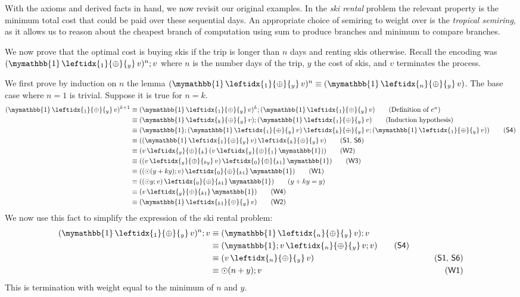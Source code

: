 \documentclass[a4paper,UKenglish,cleveref, autoref, thm-restate]{lipics-v2021}
\newcommand{\WC}[2]{\,\leftidx{_{#1}}{{\oplus}}{_{#2}}\,}
\newcommand{\bskip}{\mymathbb{1}}
\theoremstyle{plain}\newtheoremrep{thm}{Theorem}[section]
\begin{document}
	With the axioms and derived facts in hand, we now revisit our original examples. In the \emph{ski rental} problem the relevant property is the minimum total cost that could be paid over these sequential days. An appropriate choice of semiring to weight over is the \emph{tropical semiring}, as it allows us to reason about the cheapest branch of computation using sum to produce branches and minimum to compare branches. 
	\begin{exmp}
		We now prove that the optimal cost is  buying skis if the trip is longer than $n$ days and renting skis otherwise. Recall the encoding was $(\bskip \WC{1}{y} v)^n;v$ where $n$ is the number days of the trip, $y$ the cost of skis, and $v$ terminates the process. 
		
		We first prove by induction on $n$ the lemma $(\bskip \WC{1}{y} v)^n \equiv (\bskip \WC{n}{y} v)$. The base case where $n=1$ is trivial. Suppose it is true for $n=k$.
		\begin{align*}
			(\bskip \WC{1}{y} v)^{k+1} &\equiv (\bskip \WC{1}{y} v)^{k};(\bskip \WC{1}{y} v) \tag{Definition of $e^n$}\\
			&\equiv (\bskip \WC{k}{y} v);(\bskip \WC{1}{y} v) \tag{Induction hypothesis}\\
			&\equiv (\bskip;(\bskip \WC{1}{y} v) \WC{k}{y} v;(\bskip \WC{1}{y} v)) \tag{\textsf{S4}}\\
			&\equiv ((\bskip \WC{1}{y} v) \WC{k}{y} v) \tag{\textsf{S1, S6}}\\
			&\equiv (v \WC{y}{k} (v \WC{y}{1} \bskip)) \tag{\textsf{W2}}\\
			&\equiv ((v \WC{y}{ky} v) \WC{0}{k1} \bskip) \tag{\textsf{W3}}\\
			&\equiv (( \odot(y+ky);v) \WC{0}{k1} \bskip) \tag{\textsf{W1}}\\
			&\equiv (( \odot y;v) \WC{0}{k1} \bskip) \tag{$y+ky=y$}\\
			&\equiv (v \WC{y}{k1} \bskip) \tag{\textsf{W4}}\\
			&\equiv (\bskip \WC{k1}{y} v) \tag{\textsf{W2}}
		\end{align*}
		We now use this fact to simplify the expression of the ski rental problem:
		\begin{align*}
			(\bskip \WC{1}{y} v)^n;v &\equiv (\bskip \WC{n}{y} v);v \\
			&\equiv (\bskip;v\WC{n}{y} v;v) \tag{\textsf{S4}}\\
			&\equiv (v\WC{n}{y} v) & \tag{\textsf{S1, S6}}\\
			&\equiv \odot(n+y);v & \tag{\textsf{W1}}
		\end{align*}
		This is termination with weight equal to the minimum of $n$ and $y$. 
	\end{exmp}
\end{document}
